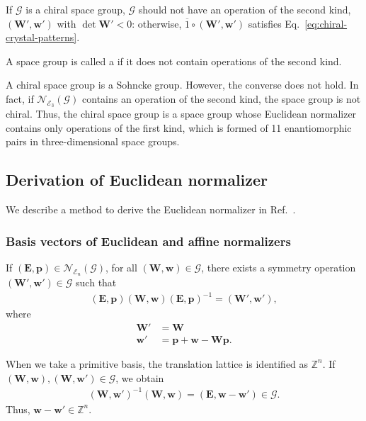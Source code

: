 If $\mathcal{G}$ is a chiral space group, $\mathcal{G}$ should not have an operation of the second kind, $(\bm{W}', \bm{w}')$ with $\det \bm{W}' < 0$: otherwise, $\overline{1} \circ (\bm{W}', \bm{w}')$ satisfies Eq.~\eqref{eq:chiral-crystal-patterns}.
\begin{screen}
  \begin{defn}
    A space group is called a  if it does not contain operations of the second kind.
  \end{defn}
\end{screen}
A chiral space group is a Sohncke group.
However, the converse does not hold.
In fact, if $\mathcal{N}_{\mathcal{E}_{3}}(\mathcal{G})$ contains an operation of the second kind, the space group is not chiral.
Thus, the chiral space group is a space group whose Euclidean normalizer contains only operations of the first kind, which is formed of 11 enantiomorphic pairs in three-dimensional space groups.



\subsection{Derivation of Euclidean normalizer}

We describe a method to derive the Euclidean normalizer in Ref.~\cite{Boisen:bx0358}.

\subsubsection{Basis vectors of Euclidean and affine normalizers}

If $( \bm{E}, \bm{p} ) \in \mathcal{N}_{\mathcal{E}_{n}}(\mathcal{G}) $, for all $(\bm{W}, \bm{w} ) \in \mathcal{G}$, there exists a symmetry operation $(\bm{W}', \bm{w}' ) \in \mathcal{G}$ such that
\begin{align}
  (\bm{E}, \bm{p}) (\bm{W}, \bm{w}) (\bm{E}, \bm{p})^{-1} = (\bm{W}', \bm{w}'),
\end{align}
where
\begin{align}
  \bm{W}' &= \bm{W} \\
  \bm{w}' &= \bm{p} + \bm{w} - \bm{Wp}.
\end{align}

When we take a primitive basis, the translation lattice is identified as $\mathbb{Z}^{n}$.
If $(\bm{W}, \bm{w} ), (\bm{W}, \bm{w}') \in \mathcal{G}$, we obtain
\begin{align}
  (\bm{W}, \bm{w}')^{-1} (\bm{W}, \bm{w}) = (\bm{E}, \bm{w} - \bm{w}' ) \in \mathcal{G}.
\end{align}
Thus, $\mathbf{w} - \mathbf{w}' \in \mathbb{Z}^{n}$.

